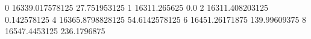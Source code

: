 0 16339.017578125 27.751953125
1 16311.265625 0.0
2 16311.408203125 0.142578125
4 16365.8798828125 54.6142578125
6 16451.26171875 139.99609375
8 16547.4453125 236.1796875
